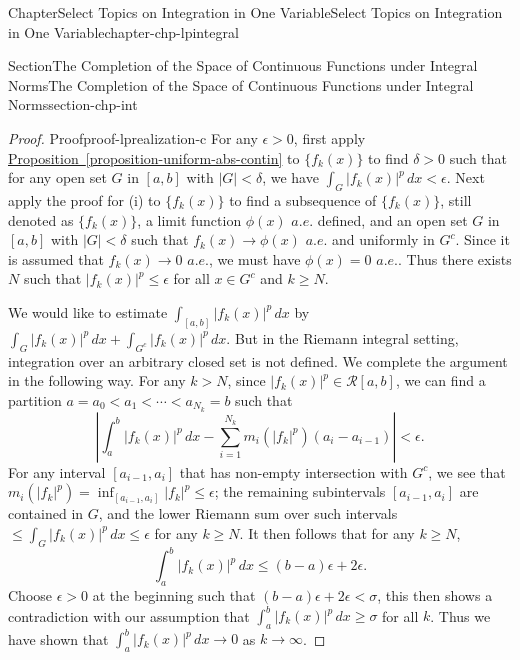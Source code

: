 \documentclass[oneside,10pt,]{book}
\newcommand{\xreffont}{\relax}
\numberwithin{equation}{section}
\begin{document}
\begin{chapterptx}{Chapter}{Select Topics on Integration in One Variable}{}{Select Topics on Integration in One Variable}{}{}{chapter-chp-lpintegral}
\begin{sectionptx}{Section}{The Completion of the Space of Continuous Functions under Integral Norms}{}{The Completion of the Space of Continuous Functions under Integral Norms}{}{}{section-chp-int}
\begin{proof}{Proof}{}{proof-lprealization-c}
For any \(\epsilon > 0\), first apply \hyperref[proposition-uniform-abs-contin]{Proposition~{\xreffont\ref{proposition-uniform-abs-contin}}} to \(\{f_{k}(x)\}\) to find \(\delta > 0\) such that for any open set \(G\) in \([a, b]\) with \(|G| < \delta\), we have \(\int_{G} |f_{k}(x)|^{p}\, dx < \epsilon\). Next apply the proof for (i) to \(\{f_{k}(x)\}\) to find a subsequence of \(\{f_{k}(x)\}\), still denoted as \(\{f_{k}(x)\}\), a limit function \(\phi(x)\) \(a.e.\) defined, and an open set \(G\) in \([a, b]\) with \(|G| < \delta\) such that \(f_{k}(x) \to \phi (x)\) \(a.e.\) and uniformly in \(G^{c}\). Since it is assumed that \(f_{k}(x) \to 0\) \(a.e.\), we must have \(\phi(x)=0\) \(a.e.\). Thus there exists \(N\) such that \(|f_{k}(x)|^{p} \le \epsilon \) for all \(x\in G^{c}\) and \(k\ge N\).%
\par
We would like to estimate \(\int_{[a, b]} |f_{k}(x)|^{p}\, dx\) by \(\int_{G} |f_{k}(x)|^{p}\, dx + \int_{G^{c}} |f_{k}(x)|^{p}\, dx\). But in the Riemann integral setting, integration over an arbitrary closed set is not defined.  We complete the argument in the following way. For any \(k > N\), since \(|f_{k}(x)|^{p} \in \mathcal R[a, b]\), we can find a partition \(a=a_{0} < a_{1} < \cdots < a_{N_{k}}=b\) such that%
\begin{equation*}
\left| \int_{a}^{b} |f_{k}(x)|^{p}\, dx -\sum_{i=1}^{N_{k}} m_{i}(|f_{k}|^{p})(a_{i}-a_{i-1})\right| < \epsilon.
\end{equation*}
For any interval \([a_{i-1}, a_{i}]\) that has non-empty intersection with \(G^{c}\), we see that \(m_{i}(|f_{k}|^{p})=\inf_{[a_{i-1}, a_{i}]}|f_{k}|^{p} \le \epsilon\); the remaining subintervals \([a_{i-1}, a_{i}]\) are contained in \(G\), and the lower Riemann sum over such intervals \(\le \int_{G} |f_{k}(x)|^{p}\, dx \le \epsilon\) for any \(k\ge N\). It then follows that for any \(k\ge N\),%
\begin{equation*}
\int_{a}^{b} |f_{k}(x)|^{p}\, dx\le (b-a)\epsilon + 2\epsilon.
\end{equation*}
Choose \(\epsilon >0 \) at the beginning such that \((b-a)\epsilon + 2\epsilon < \sigma\), this  then shows a contradiction with our assumption that \(\int_{a}^{b} |f_{k}(x)|^{p}\, dx \ge \sigma\) for all \(k\). Thus we have shown that \(\int_{a}^{b} |f_{k}(x)|^{p}\, dx\to 0\) as \(k\to \infty\).%
\end{proof}
%

\end{sectionptx}
\end{chapterptx}
\end{document}
